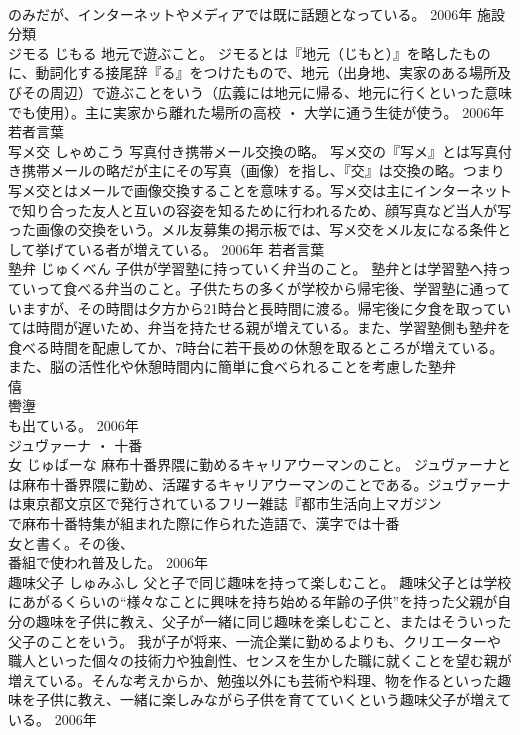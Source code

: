 \documentclass[8pt]{extreport}
\begin{document}
\begin{CJK}{UTF8}{min}
\\	のみだが、インターネットやメディアでは既に話題となっている。	2006年	施設分類	
\\	ジモる	じもる	地元で遊ぶこと。	ジモるとは『地元（じもと）』を略したものに、動詞化する接尾辞『る』をつけたもので、地元（出身地、実家のある場所及びその周辺）で遊ぶことをいう（広義には地元に帰る、地元に行くといった意味でも使用）。主に実家から離れた場所の高校 ・ 大学に通う生徒が使う。	2006年	若者言葉	
\\	写メ交	しゃめこう	写真付き携帯メール交換の略。	写メ交の『写メ』とは写真付き携帯メールの略だが主にその写真（画像）を指し、『交』は交換の略。つまり写メ交とはメールで画像交換することを意味する。写メ交は主にインターネットで知り合った友人と互いの容姿を知るために行われるため、顔写真など当人が写った画像の交換をいう。メル友募集の掲示板では、写メ交をメル友になる条件として挙げている者が増えている。	2006年	若者言葉	
\\	塾弁	じゅくべん	子供が学習塾に持っていく弁当のこと。	塾弁とは学習塾へ持っていって食べる弁当のこと。子供たちの多くが学校から帰宅後、学習塾に通っていますが、その時間は夕方から21時台と長時間に渡る。帰宅後に夕食を取っていては時間が遅いため、弁当を持たせる親が増えている。また、学習塾側も塾弁を食べる時間を配慮してか、7時台に若干長めの休憩を取るところが増えている。また、脳の活性化や休憩時間内に簡単に食べられることを考慮した塾弁
\\	僖
\\	轡塰
\\	も出ている。	2006年	
\\	ジュヴァーナ ・ 十番
\\	女	じゅばーな	麻布十番界隈に勤めるキャリアウーマンのこと。	ジュヴァーナとは麻布十番界隈に勤め、活躍するキャリアウーマンのことである。ジュヴァーナは東京都文京区で発行されているフリー雑誌『都市生活向上マガジン 
\\	で麻布十番特集が組まれた際に作られた造語で、漢字では十番
\\	女と書く。その後、
\\	番組で使われ普及した。	2006年	
\\	趣味父子	しゅみふし	父と子で同じ趣味を持って楽しむこと。	趣味父子とは学校にあがるくらいの“様々なことに興味を持ち始める年齢の子供”を持った父親が自分の趣味を子供に教え、父子が一緒に同じ趣味を楽しむこと、またはそういった父子のことをいう。 我が子が将来、一流企業に勤めるよりも、クリエーターや職人といった個々の技術力や独創性、センスを生かした職に就くことを望む親が増えている。そんな考えからか、勉強以外にも芸術や料理、物を作るといった趣味を子供に教え、一緒に楽しみながら子供を育てていくという趣味父子が増えている。	2006年	

\end{CJK}
\end{document}
